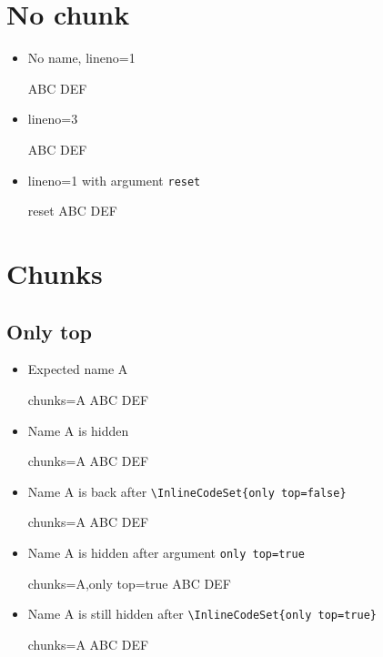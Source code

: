 \documentclass{article}
\begin{document}
\section{No chunk}
\begin{itemize}
\item No name, lineno=1
\begin{InlineCode}{}
ABC
DEF
\end{InlineCode}
\item
lineno=3
\begin{InlineCode}{}
ABC
DEF
\end{InlineCode}
\item
lineno=1 with argument \texttt{reset}
\begin{InlineCode}{reset}
ABC
DEF
\end{InlineCode}
\end{itemize}
\section{Chunks}
\subsection{Only top}
\begin{itemize}
\item  Expected name A
\begin{InlineCode}{chunks=A}
ABC
DEF
\end{InlineCode}
\item Name A is hidden
\begin{InlineCode}{chunks=A}
ABC
DEF
\end{InlineCode}
\item Name A is back after \verb|\InlineCodeSet{only top=false}|
\begin{InlineCode}{chunks=A}
ABC
DEF
\end{InlineCode}
\item Name A is hidden after argument \verb|only top=true|
\begin{InlineCode}{chunks=A,only top=true}
ABC
DEF
\end{InlineCode}
\item Name A is still hidden after \verb|\InlineCodeSet{only top=true}|
\begin{InlineCode}{chunks=A}
ABC
DEF
\end{InlineCode}
\end{itemize}
\end{document}
